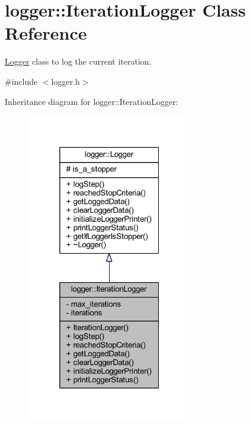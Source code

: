 \hypertarget{classlogger_1_1_iteration_logger}{}\section{logger\+:\+:Iteration\+Logger Class Reference}
\label{classlogger_1_1_iteration_logger}


\mbox{\hyperlink{classlogger_1_1_logger}{Logger}} class to log the current iteration.  




{\ttfamily \#include $<$logger.\+h$>$}



Inheritance diagram for logger\+:\+:Iteration\+Logger\+:
\nopagebreak
\begin{figure}[H]
\begin{center}
\leavevmode
\includegraphics[width=205pt]{classlogger_1_1_iteration_logger__inherit__graph}
\end{center}
\end{figure}


